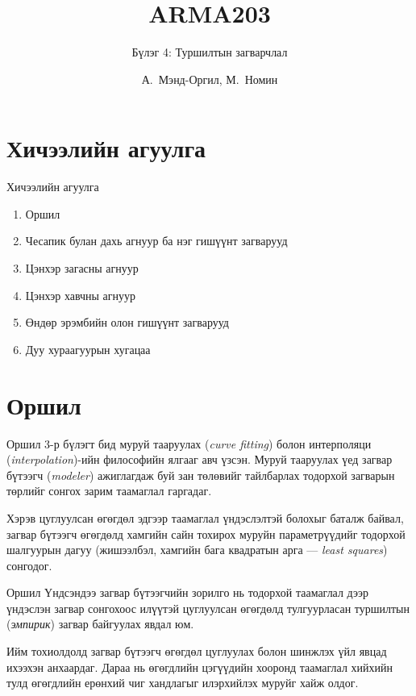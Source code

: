 \documentclass[dvipsnames]{beamer}
\title[ARMA203]{ARMA203}
\subtitle{Бүлэг 4: Туршилтын загварчлал}
\author[А.~Мэнд-Оргил, М.~Номин]{А.~Мэнд-Оргил, М.~Номин}
\institute[МУИС]{Статистик, Хэрэглээний математикийн тэнхим\\Мэдээллийн технологи, электроникийн сургууль\\Монгол Улсын Их Сургууль}
\date{}
\begin{document}
\begin{frame}
\titlepage
\end{frame}

\section{Хичээлийн агуулга}

\begin{frame}{Хичээлийн агуулга}
\begin{enumerate}
\item Оршил
\item Чесапик булан дахь агнуур ба нэг гишүүнт загварууд
\item Цэнхэр загасны агнуур
\item Цэнхэр хавчны агнуур
\item Өндөр эрэмбийн олон гишүүнт загварууд
\item Дуу хураагуурын хугацаа
\end{enumerate}
\end{frame}

\section{Оршил}

\begin{frame}{Оршил}
\small
3-р бүлэгт бид муруй тааруулах (\emph{curve fitting}) болон
интерполяци (\emph{interpolation})-ийн философийн ялгааг авч үзсэн.
Муруй тааруулах үед загвар бүтээгч (\emph{modeler}) ажиглагдаж буй
зан төлөвийг тайлбарлах тодорхой загварын төрлийг сонгох зарим
таамаглал гаргадаг.

\medskip

Хэрэв цуглуулсан өгөгдөл эдгээр таамаглал үндэслэлтэй болохыг баталж
байвал, загвар бүтээгч өгөгдөлд хамгийн сайн тохирох муруйн
параметрүүдийг тодорхой шалгуурын дагуу (жишээлбэл, хамгийн бага
квадратын арга --- \emph{least squares}) сонгодог.
\end{frame}

\begin{frame}{Оршил}
\small
Үндсэндээ загвар бүтээгчийн зорилго нь тодорхой таамаглал дээр үндэслэн
загвар сонгохоос илүүтэй цуглуулсан өгөгдөлд тулгуурласан туршилтын
(\emph{эмпирик}) загвар байгуулах явдал юм.

\medskip

Ийм тохиолдолд загвар бүтээгч өгөгдөл цуглуулах болон шинжлэх үйл
явцад ихээхэн анхаардаг. Дараа нь өгөгдлийн цэгүүдийн хооронд таамаглал
хийхийн тулд өгөгдлийн ерөнхий чиг хандлагыг илэрхийлэх муруйг хайж
олдог.
\end{frame}
\end{document}
